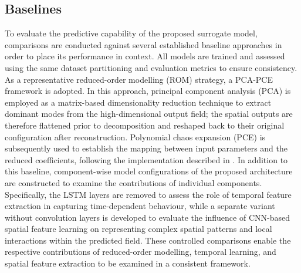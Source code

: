 \subsection{Baselines}\noindent
To evaluate the predictive capability of the proposed surrogate model, comparisons are conducted against several established baseline approaches in order to place its performance in context. All models are trained and assessed using the same dataset partitioning and evaluation metrics to ensure consistency. As a representative reduced-order modelling (ROM) strategy, a PCA-PCE framework is adopted. In this approach, principal component analysis (PCA) is employed as a matrix-based dimensionality reduction technique to extract dominant modes from the high-dimensional output field; the spatial outputs are therefore flattened prior to decomposition and reshaped back to their original configuration after reconstruction. Polynomial chaos expansion (PCE) is subsequently used to establish the mapping between input parameters and the reduced coefficients, following the implementation described in \cite{yang2026}. In addition to this baseline, component-wise model configurations of the proposed architecture are constructed to examine the contributions of individual components. Specifically, the LSTM layers are removed to assess the role of temporal feature extraction in capturing time-dependent behaviour, while a separate variant without convolution layers is developed to evaluate the influence of CNN-based spatial feature learning on representing complex spatial patterns and local interactions within the predicted field. These controlled comparisons enable the respective contributions of reduced-order modelling, temporal learning, and spatial feature extraction to be examined in a consistent framework.


